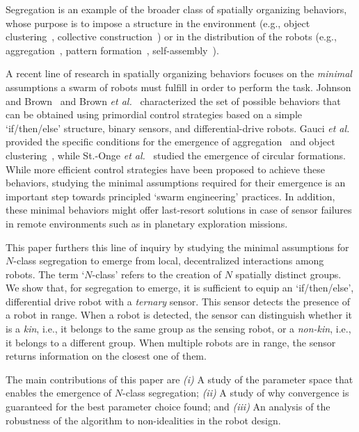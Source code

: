 \documentclass[letterpaper, 10 pt, conference]{ieeeconf}
\begin{document}
Segregation is an example of the broader class of spatially organizing
behaviors, whose purpose is to impose a structure in the environment (e.g.,
object clustering~\cite{gauci_clustering_2014}, collective
construction~\cite{Bolger2010}) or in the distribution of the robots (e.g.,
aggregation~\cite{shlyakhov_survey_2017}, pattern
formation~\cite{Pinciroli:DARS2016}, self-assembly~\cite{gross2008self}).

A recent line of research in spatially organizing behaviors focuses on the
\emph{minimal} assumptions a swarm of robots must fulfill in order to perform the
task. Johnson and Brown~\cite{johnson_evolving_2016} and Brown \emph{et
al.}~\cite{brown_discovery_2018} characterized the set of possible behaviors
that can be obtained using primordial control strategies based on a simple
`if/then/else' structure, binary sensors, and differential-drive robots. Gauci
\emph{et al.} provided the specific conditions for the emergence of
aggregation~\cite{gauci_evolving_2014} and object
clustering~\cite{gauci_clustering_2014}, while St.-Onge \emph{et
al.}~\cite{StOnge:IROS2018} studied the emergence of circular
formations. While more efficient control strategies have been proposed to
achieve these behaviors, studying the minimal assumptions required for their emergence is
an important step towards principled `swarm engineering' practices. In addition,
these minimal behaviors might offer last-resort solutions in case of sensor
failures in remote environments such as in planetary exploration missions.

This paper furthers this line of inquiry by studying the minimal assumptions for
$N$-class segregation to emerge from local, decentralized interactions among
robots. The term `$N$-class' refers to the creation of $N$ spatially distinct
groups. We show that, for segregation to emerge, it is sufficient to equip an
`if/then/else', differential drive robot with a \emph{ternary} sensor. This
sensor detects the presence of a robot in range. When a robot is detected, the
sensor can distinguish whether it is a \emph{kin}, i.e., it belongs to the same
group as the sensing robot, or a \emph{non-kin}, i.e., it belongs to a different
group. When multiple robots are in range, the sensor returns information on the
closest one of them.

The main contributions of this paper are \emph{(i)} A study of the parameter
space that enables the emergence of $N$-class segregation; \emph{(ii)} A study
of why convergence is guaranteed for the best parameter choice found; and
\emph{(iii)} An analysis of the robustness of the algorithm to non-idealities in
the robot design.
\end{document}
